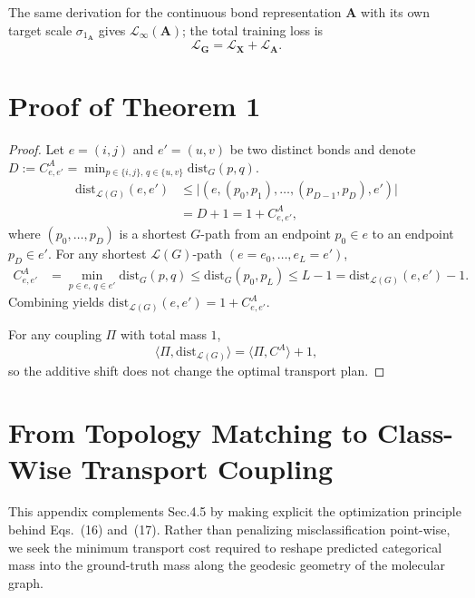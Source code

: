 \documentclass[journal,twoside,web]{ieeecolor}
\begin{document}
The same derivation for the continuous bond representation $\mathbf{A}$ with its own target scale
$\sigma_{1_\mathbf{A}}$ gives $\mathcal{L}_{\infty}(\mathbf{A})$; the total training loss is
\[
\mathcal{L}_{\mathbf{G}} = \mathcal{L}_{\mathbf{X}} + \mathcal{L}_{\mathbf{A}}.
\]


\section{Proof of Theorem 1}
\label{app:qw:edge_cost}

\begin{proof}
Let $e=(i,j)$ and $e'=(u,v)$ be two distinct bonds and denote
$D:=C^{A}_{e,e'}=\min_{p\in\{i,j\},\,q\in\{u,v\}}\mathrm{dist}_G(p,q)$.
\begin{align}
\mathrm{dist}_{\mathcal{L}(G)}(e,e')
&\le
\big|(e,(p_0,p_1),\ldots,(p_{D-1},p_D),e')\big|
\\
&=
D+1
=
1+C^{A}_{e,e'},
\end{align}
where $(p_0,\ldots,p_D)$ is a shortest $G$-path from an endpoint $p_0\in e$ to an endpoint $p_D\in e'$.
For any shortest $\mathcal{L}(G)$-path $(e=e_0,\ldots,e_L=e')$,
\begin{align}
C^{A}_{e,e'}
&=
\min_{p\in e,\,q\in e'}\mathrm{dist}_G(p,q)
\le
\mathrm{dist}_G(p_0,p_L)
\le
L-1
=
\mathrm{dist}_{\mathcal{L}(G)}(e,e')-1 .
\end{align}
Combining yields $\mathrm{dist}_{\mathcal{L}(G)}(e,e')=1+C^{A}_{e,e'}$.

For any coupling $\Pi$ with total mass $1$,
\begin{equation}
\langle \Pi,\mathrm{dist}_{\mathcal{L}(G)}\rangle
=
\langle \Pi,C^{A}\rangle + 1,
\end{equation}
so the additive shift does not change the optimal transport plan.
\end{proof}


\section{From Topology Matching to Class-Wise Transport Coupling}
\label{app:qw:derivation}

This appendix complements Sec.4.5 by making explicit the optimization principle behind Eqs.~(16) and~(17). Rather than penalizing misclassification point-wise, we seek the minimum transport cost required to reshape predicted categorical mass into the ground-truth mass along the geodesic geometry of the molecular graph.
\end{document}
